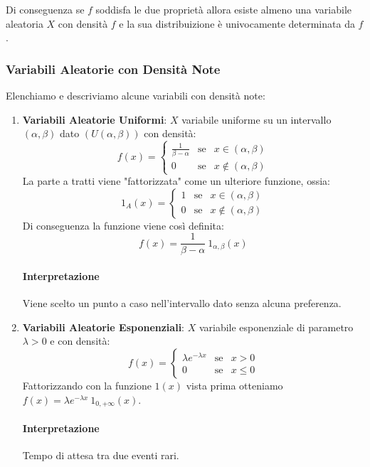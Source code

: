 \documentclass{article}
\begin{document}
Di conseguenza se $f$ soddisfa le due proprietà allora esiste almeno una variabile aleatoria $X$ con densità $f$ e la sua distribuizione è
univocamente determinata da $f$. 

\subsubsection{Variabili Aleatorie con Densità Note}

Elenchiamo e descriviamo alcune variabili con densità note:

\begin{enumerate}
    \item \textbf{Variabili Aleatorie Uniformi}: $X$ variabile uniforme su un intervallo $(\alpha, \beta)$ dato $(U(\alpha, \beta))$ con densità:
    \[ f(x) =  \left\{ \begin{array}{rcl}
        \frac{1}{\beta - \alpha} & \mbox{se} & x \in (\alpha,\beta) \\
         0 & \mbox{se} & x \notin (\alpha,\beta)
        \end{array}\right. \]
    La parte a tratti viene "fattorizzata" come un ulteriore funzione, ossia:
    \[ {1}_{A}(x) =  \left\{ \begin{array}{rcl}
        {1} & \mbox{se} & x \in (\alpha,\beta) \\
         0 & \mbox{se} & x \notin (\alpha,\beta)
        \end{array}\right. \]
    Di conseguenza la funzione viene così definita:
    \[ f(x) = \frac{1}{\beta - \alpha} \: 1_{\alpha, \beta}(x) \]
    \paragraph{Interpretazione} Viene scelto un punto a caso nell'intervallo dato senza alcuna preferenza.

    \item \textbf{Variabili Aleatorie Esponenziali}: $X$ variabile esponenziale di parametro $\lambda > 0$ e con densità:
    \vspace*{15px}
    \[ f(x) =  \left\{ \begin{array}{rcl}
        \lambda e^{-\lambda x} & \mbox{se} & x > 0 \\
         0 & \mbox{se} & x \leq 0
        \end{array}\right. \]
    Fattorizzando con la funzione $1(x)$ vista prima otteniamo $f(x) = \lambda e^{-\lambda x}\: 1_{0,+\infty}(x) $. 
    \paragraph{Interpretazione} Tempo di attesa tra due eventi rari.
\end{enumerate}
\end{document}
